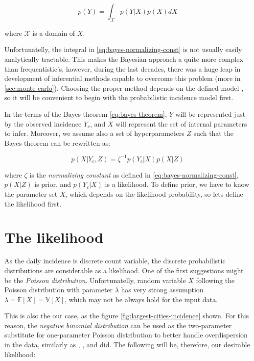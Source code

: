 \documentclass[
  digital, %
  oneside, %
  lof,     %
  lot,     %
]{fithesis4}
\begin{document}
\begin{equation}\label{eq:bayes-normalizing-const}
  p(Y) = \int_\mathcal{X} p( Y | X ) p(X) dX
\end{equation}

where $\mathcal{X}$ is a domain of $X$.

Unfortunatelly, the integral in 
\eqref{eq:bayes-normalizing-const} is not usually
easily analytically tractable.
This makes the Bayesian approach a quite more
complex than frequentistic's, 
however, during the last decades, there was a huge leap 
in development of inferential methods capable to
overcome this problem (more in \autoref{sec:monte-carlo}). 
Choosing the proper method depends on the 
defined model \cite{pfeffer2016}, so it will be 
convenient to begin with the probabilistic
incidence model first.


In the terms of the Bayes theorem \eqref{eq:bayes-theorem},
$Y$ will be represented just by the observed incidence $Y_c$, and
$X$ will represent the set of internal parameters to infer.
Moreover, we assume also a set of hyperparameters $Z$ such that
the Bayes theorem can be rewritten as:

\begin{equation}\label{eq:bayes-theorem-customized}
  p( X | Y_c, Z ) = \zeta^{-1} p( Y_c | X ) p(X | Z)
\end{equation}

where $\zeta$ is the \textit{normalizing constant} as
defined in \eqref{eq:bayes-normalizing-const},
$p(X | Z)$ is prior, and $p( Y_c | X )$ is a likelihood.
To define prior, we have to know the parameter set $X$, which
depends on the likelihood probability, so lets define 
the likelihood first.


\section{The likelihood}

As the daily incidence is discrete count variable, 
the discrete probabilistic distributions are 
considerable as a likelihood. One of the first suggestions 
might be the \textit{Poisson distribution}. Unfortunatelly, random 
variable $X$ following the Poisson distribution with 
parameter $\lambda$ has very strong assumption 
$\lambda = \mathbb{E}\left[ X \right] = \mathbb{V}\left[ X \right]$, 
which may not be always hold for the input data. 

This is also the our case, as the 
figure \ref{fig:largest-cities-incidence} shown. 
For this reason, the \textit{negative binomial distribution} can 
be used as the two-parameter substitute for 
one-parameter Poisson distribution to better 
handle overdispersion in the data, similarly 
as \cite{simone2020}, \cite{wallinga2004}, 
\cite{alzahrani2018} and \cite{manevski2020} did.
The following will be, therefore, our
desirable likelihood:
\end{document}
